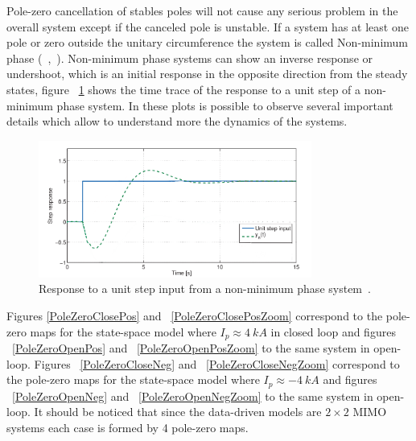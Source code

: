 Pole-zero cancellation of stables poles will not cause any serious problem in the overall system except if the canceled pole is unstable. If a system has at least one pole or zero outside the unitary circumference the system is called Non-minimum phase (~\cite[Chapter~6]{Ogata2009},~\cite[Chapter~2]{Golnaraghi2010}). Non-minimum phase systems can show an inverse response or undershoot, which is an initial response in the opposite direction from the steady states, figure ~\ref{nonmin} shows the time trace of the response to a unit step of a non-minimum phase system. 
In these plots is possible to observe several important details which allow to understand more the dynamics of the systems. 

\begin{figure}[h]
	\centering
	\includegraphics[width=0.8\textwidth]{Chp5/nonminimum_edit.png}
	\caption{Response to a unit step input from a non-minimum phase system~\cite{Uren2011}.\label{nonmin}}
\end{figure} \smallskip

Figures \ref{PoleZeroClosePos} and ~\ref{PoleZeroClosePosZoom} correspond to the pole-zero maps for the state-space model where $I_p\approx 4~kA$ in closed loop and figures ~\ref{PoleZeroOpenPos} and ~\ref{PoleZeroOpenPosZoom} to the same system in open-loop. Figures ~\ref{PoleZeroCloseNeg} and ~\ref{PoleZeroCloseNegZoom} correspond to the pole-zero maps for the state-space model where $I_p\approx -4~kA$ and figures ~\ref{PoleZeroOpenNeg} and ~\ref{PoleZeroOpenNegZoom} to the same system in open-loop. It should be noticed that since the data-driven models are $2\times2$ MIMO systems each case is formed by 4 pole-zero maps.\smallskip
 


